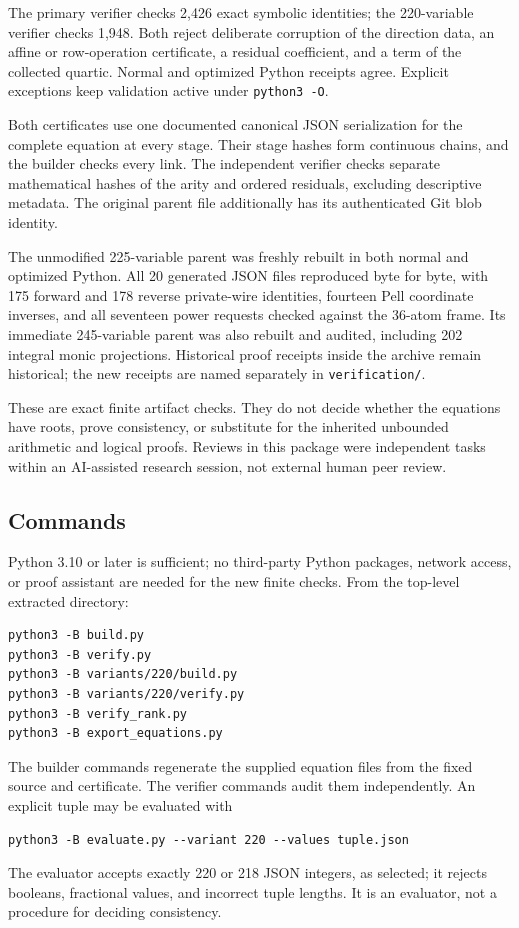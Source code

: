 \documentclass[10pt,letterpaper]{article}
\theoremstyle{definition}\newtheorem{definition}[theorem]{Definition}
\begin{document}
The primary verifier checks 2,426 exact symbolic identities; the
220-variable verifier checks 1,948. Both reject deliberate corruption of
the direction data, an affine or row-operation certificate, a residual
coefficient, and a term of the collected quartic. Normal and optimized
Python receipts agree. Explicit exceptions keep validation active under
\texttt{python3 -O}.

Both certificates use one documented canonical JSON serialization for
the complete equation at every stage. Their stage hashes form continuous
chains, and the builder checks every link. The independent verifier checks
separate mathematical hashes of the arity and ordered residuals, excluding
descriptive metadata. The original parent file additionally has its
authenticated Git blob identity.

The unmodified 225-variable parent was freshly rebuilt in both normal and
optimized Python. All 20 generated JSON files reproduced byte for byte,
with 175 forward and 178 reverse private-wire identities, fourteen Pell
coordinate inverses, and all seventeen power requests checked against the
36-atom frame. Its immediate 245-variable parent was also rebuilt and
audited, including 202 integral monic projections. Historical proof
receipts inside the archive remain historical; the new receipts are named
separately in \texttt{verification/}.

These are exact finite artifact checks. They do not decide whether the
equations have roots, prove consistency, or substitute for the inherited
unbounded arithmetic and logical proofs. Reviews in this package were
independent tasks within an AI-assisted research session, not external
human peer review.

\subsection{Commands}
Python 3.10 or later is sufficient; no third-party Python packages, network
access, or proof assistant are needed for the new finite checks. From the
top-level extracted directory:
\begin{verbatim}
python3 -B build.py
python3 -B verify.py
python3 -B variants/220/build.py
python3 -B variants/220/verify.py
python3 -B verify_rank.py
python3 -B export_equations.py
\end{verbatim}
The builder commands regenerate the supplied equation files from the fixed
source and certificate. The verifier commands audit them independently.
An explicit tuple may be evaluated with
\begin{verbatim}
python3 -B evaluate.py --variant 220 --values tuple.json
\end{verbatim}
The evaluator accepts exactly 220 or 218 JSON integers, as selected; it
rejects booleans, fractional values, and incorrect tuple lengths. It is
an evaluator, not a procedure for deciding consistency.
\end{document}
